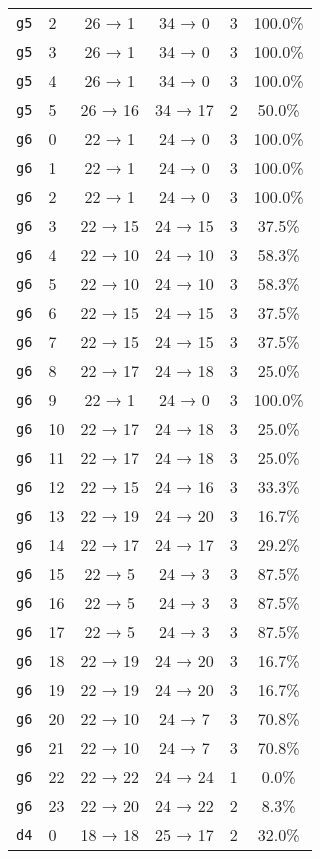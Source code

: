 \begin{tabular}{llcccc}
\texttt{g5} & 2 & 26 → 1 & 34 → 0 & 3 & 100.0\% \\
\texttt{g5} & 3 & 26 → 1 & 34 → 0 & 3 & 100.0\% \\
\texttt{g5} & 4 & 26 → 1 & 34 → 0 & 3 & 100.0\% \\
\texttt{g5} & 5 & 26 → 16 & 34 → 17 & 2 & 50.0\% \\
\texttt{g6} & 0 & 22 → 1 & 24 → 0 & 3 & 100.0\% \\
\texttt{g6} & 1 & 22 → 1 & 24 → 0 & 3 & 100.0\% \\
\texttt{g6} & 2 & 22 → 1 & 24 → 0 & 3 & 100.0\% \\
\texttt{g6} & 3 & 22 → 15 & 24 → 15 & 3 & 37.5\% \\
\texttt{g6} & 4 & 22 → 10 & 24 → 10 & 3 & 58.3\% \\
\texttt{g6} & 5 & 22 → 10 & 24 → 10 & 3 & 58.3\% \\
\texttt{g6} & 6 & 22 → 15 & 24 → 15 & 3 & 37.5\% \\
\texttt{g6} & 7 & 22 → 15 & 24 → 15 & 3 & 37.5\% \\
\texttt{g6} & 8 & 22 → 17 & 24 → 18 & 3 & 25.0\% \\
\texttt{g6} & 9 & 22 → 1 & 24 → 0 & 3 & 100.0\% \\
\texttt{g6} & 10 & 22 → 17 & 24 → 18 & 3 & 25.0\% \\
\texttt{g6} & 11 & 22 → 17 & 24 → 18 & 3 & 25.0\% \\
\texttt{g6} & 12 & 22 → 15 & 24 → 16 & 3 & 33.3\% \\
\texttt{g6} & 13 & 22 → 19 & 24 → 20 & 3 & 16.7\% \\
\texttt{g6} & 14 & 22 → 17 & 24 → 17 & 3 & 29.2\% \\
\texttt{g6} & 15 & 22 → 5 & 24 → 3 & 3 & 87.5\% \\
\texttt{g6} & 16 & 22 → 5 & 24 → 3 & 3 & 87.5\% \\
\texttt{g6} & 17 & 22 → 5 & 24 → 3 & 3 & 87.5\% \\
\texttt{g6} & 18 & 22 → 19 & 24 → 20 & 3 & 16.7\% \\
\texttt{g6} & 19 & 22 → 19 & 24 → 20 & 3 & 16.7\% \\
\texttt{g6} & 20 & 22 → 10 & 24 → 7 & 3 & 70.8\% \\
\texttt{g6} & 21 & 22 → 10 & 24 → 7 & 3 & 70.8\% \\
\texttt{g6} & 22 & 22 → 22 & 24 → 24 & 1 & 0.0\% \\
\texttt{g6} & 23 & 22 → 20 & 24 → 22 & 2 & 8.3\% \\
\texttt{d4} & 0 & 18 → 18 & 25 → 17 & 2 & 32.0\% \\

\end{tabular}
